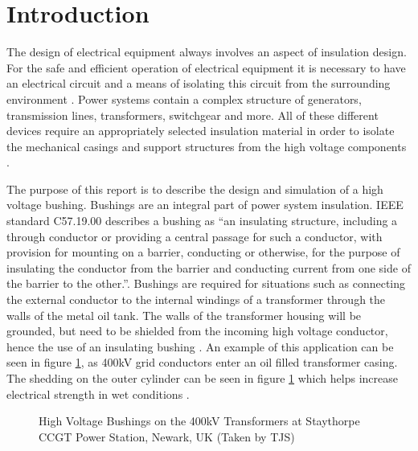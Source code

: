 \section{Introduction}
The design of electrical equipment always involves an aspect of insulation design.
For the safe and efficient operation of electrical equipment it is necessary to have an electrical circuit and a means of isolating this circuit from the surrounding environment \cite{warne2005newnes}.
Power systems contain a complex structure of generators, transmission lines, transformers, switchgear and more. 
All of these different devices require an appropriately selected insulation material in order to isolate the mechanical casings and support structures from the high voltage components \cite{james2008condition}.

The purpose of this report is to describe the design and simulation of a high voltage bushing. Bushings are an integral part of power system insulation. 
IEEE standard C57.19.00 describes a bushing as ``an insulating structure, including a through conductor or providing a central passage for such a conductor, with provision for mounting on a barrier, conducting or otherwise, for the purpose of insulating the conductor from the barrier and conducting current from one side of the barrier to the other.''\cite{1440990}.
Bushings are required for situations such as connecting the external conductor to the internal windings of a transformer through the walls of the metal oil tank.
The walls of the transformer housing will be grounded, but need to be shielded from the incoming high voltage conductor, hence the use of an insulating bushing \cite{warne2005newnes}.
An example of this application can be seen in figure \ref{Figure:BothBushPics}, as 400kV grid conductors enter an oil filled transformer casing.
The shedding on the outer cylinder can be seen in figure \ref{Figure:BothBushPics} which helps increase electrical strength in wet conditions \cite{warne2005newnes}.

\begin{figure}[!htb]
  \centering
\caption{High Voltage Bushings on the 400kV Transformers at Staythorpe CCGT Power Station, Newark, UK (Taken by TJS)}
  \label{Figure:BothBushPics}
\end{figure}

